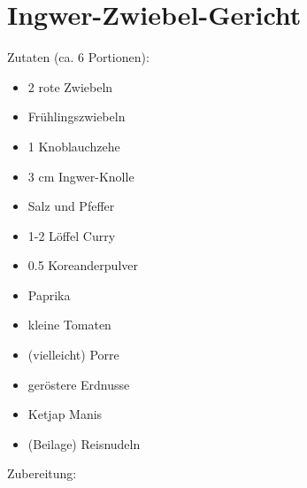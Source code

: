 \section{Ingwer-Zwiebel-Gericht}
Zutaten (ca. 6 Portionen):
\begin{itemize}
    \item 2 rote Zwiebeln
	\item Frühlingszwiebeln
    \item 1 Knoblauchzehe
    \item 3 cm Ingwer-Knolle
    \item Salz und Pfeffer
	\item 1-2 Löffel Curry
	\item 0.5 Koreanderpulver
	\item Paprika
	\item kleine Tomaten
	\item (vielleicht) Porre
	\item geröstere Erdnusse
	\item Ketjap Manis
    \item (Beilage) Reisnudeln
\end{itemize}

\noindent Zubereitung:



\noindent %
\newpage
\mbox{}
\vfill
\begin{center}
\end{center}
\vfill
\mbox{ }
\newpage

